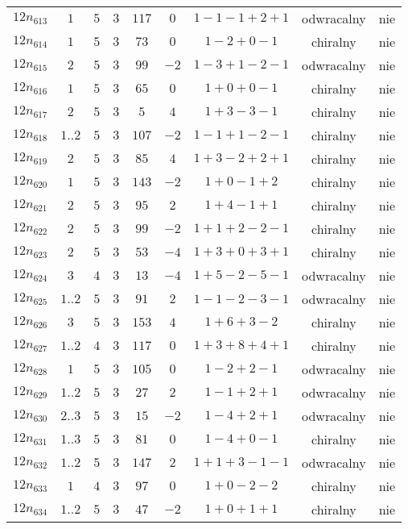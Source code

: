 \begin{longtable}{ccccccccc}
$12n_{613}$ & $1$ & $5$ & $3$ & $117$ & $0$ & $1-1-1+2+1$ & odwracalny & nie \\
$12n_{614}$ & $1$ & $5$ & $3$ & $73$ & $0$ & $1-2+0-1$ & chiralny & nie \\
$12n_{615}$ & $2$ & $5$ & $3$ & $99$ & $-2$ & $1-3+1-2-1$ & odwracalny & nie \\
$12n_{616}$ & $1$ & $5$ & $3$ & $65$ & $0$ & $1+0+0-1$ & chiralny & nie \\
$12n_{617}$ & $2$ & $5$ & $3$ & $5$ & $4$ & $1+3-3-1$ & chiralny & nie \\
$12n_{618}$ & $1..2$ & $5$ & $3$ & $107$ & $-2$ & $1-1+1-2-1$ & chiralny & nie \\
$12n_{619}$ & $2$ & $5$ & $3$ & $85$ & $4$ & $1+3-2+2+1$ & chiralny & nie \\
$12n_{620}$ & $1$ & $5$ & $3$ & $143$ & $-2$ & $1+0-1+2$ & chiralny & nie \\
$12n_{621}$ & $2$ & $5$ & $3$ & $95$ & $2$ & $1+4-1+1$ & chiralny & nie \\
$12n_{622}$ & $2$ & $5$ & $3$ & $99$ & $-2$ & $1+1+2-2-1$ & chiralny & nie \\
$12n_{623}$ & $2$ & $5$ & $3$ & $53$ & $-4$ & $1+3+0+3+1$ & chiralny & nie \\
$12n_{624}$ & $3$ & $4$ & $3$ & $13$ & $-4$ & $1+5-2-5-1$ & odwracalny & nie \\
$12n_{625}$ & $1..2$ & $5$ & $3$ & $91$ & $2$ & $1-1-2-3-1$ & odwracalny & nie \\
$12n_{626}$ & $3$ & $5$ & $3$ & $153$ & $4$ & $1+6+3-2$ & chiralny & nie \\
$12n_{627}$ & $1..2$ & $4$ & $3$ & $117$ & $0$ & $1+3+8+4+1$ & chiralny & nie \\
$12n_{628}$ & $1$ & $5$ & $3$ & $105$ & $0$ & $1-2+2-1$ & odwracalny & nie \\
$12n_{629}$ & $1..2$ & $5$ & $3$ & $27$ & $2$ & $1-1+2+1$ & odwracalny & nie \\
$12n_{630}$ & $2..3$ & $5$ & $3$ & $15$ & $-2$ & $1-4+2+1$ & odwracalny & nie \\
$12n_{631}$ & $1..3$ & $5$ & $3$ & $81$ & $0$ & $1-4+0-1$ & chiralny & nie \\
$12n_{632}$ & $1..2$ & $5$ & $3$ & $147$ & $2$ & $1+1+3-1-1$ & odwracalny & nie \\
$12n_{633}$ & $1$ & $4$ & $3$ & $97$ & $0$ & $1+0-2-2$ & chiralny & nie \\
$12n_{634}$ & $1..2$ & $5$ & $3$ & $47$ & $-2$ & $1+0+1+1$ & chiralny & nie \\

\end{longtable}
